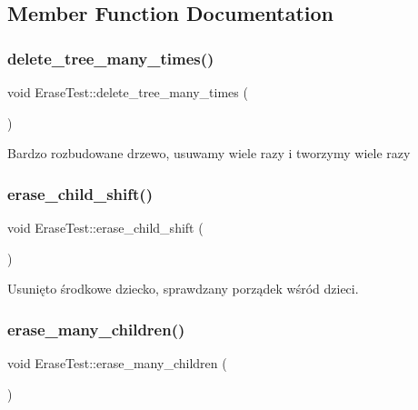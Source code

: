 \subsection{Member Function Documentation}
\mbox{\label{class_erase_test_ac80cbc1c11f5ca0f218f0632b5b368b5}} 
\subsubsection{\texorpdfstring{delete\+\_\+tree\+\_\+many\+\_\+times()}{delete\_tree\_many\_times()}}
{\footnotesize\ttfamily void Erase\+Test\+::delete\+\_\+tree\+\_\+many\+\_\+times (\begin{DoxyParamCaption}{ }\end{DoxyParamCaption})\hspace{0.3cm}{\ttfamily [inline]}}

Bardzo rozbudowane drzewo, usuwamy wiele razy i tworzymy wiele razy \mbox{\label{class_erase_test_a0897542be38d32150b6c080449bf0b2d}} 
\subsubsection{\texorpdfstring{erase\+\_\+child\+\_\+shift()}{erase\_child\_shift()}}
{\footnotesize\ttfamily void Erase\+Test\+::erase\+\_\+child\+\_\+shift (\begin{DoxyParamCaption}{ }\end{DoxyParamCaption})\hspace{0.3cm}{\ttfamily [inline]}}

Usunięto środkowe dziecko, sprawdzany porządek wśród dzieci. \mbox{\label{class_erase_test_a7c3b732833940974b289fd52f1190306}} 
\subsubsection{\texorpdfstring{erase\+\_\+many\+\_\+children()}{erase\_many\_children()}}
{\footnotesize\ttfamily void Erase\+Test\+::erase\+\_\+many\+\_\+children (\begin{DoxyParamCaption}{ }\end{DoxyParamCaption})\hspace{0.3cm}{\ttfamily [inline]}}


